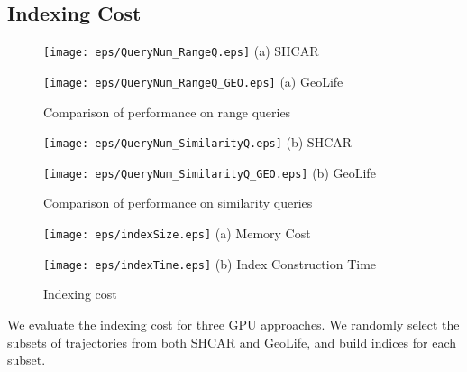 \documentclass[10pt,conference,letterpaper]{IEEEtran}
\begin{document}
\subsection{Indexing Cost}

\begin{figure}[!t]
	\centering
	\scriptsize{
		\begin{minipage}{0.48\linewidth}
			\centering
			\texttt{[image: eps/QueryNum\_RangeQ.eps]}
			(a) SHCAR
		\end{minipage}
		\hfill
		\begin{minipage}{0.48\linewidth}
			\centering
			\texttt{[image: eps/QueryNum\_RangeQ\_GEO.eps]}
			(a) GeoLife
		\end{minipage}	
	}
	\caption{Comparison of performance on range queries \label{fig:QueryNum_range}}
	\vspace{-.1in}
\end{figure}

\begin{figure}[!t]\centering
	\scriptsize{
		\begin{minipage}{0.48\linewidth}
			\centering
			\texttt{[image: eps/QueryNum\_SimilarityQ.eps]}
			(b) SHCAR
		\end{minipage}
		\hfill
		\begin{minipage}{0.48\linewidth}
			\centering
			\texttt{[image: eps/QueryNum\_SimilarityQ\_GEO.eps]}
			(b) GeoLife
		\end{minipage}
	}
	\caption{Comparison of performance on similarity queries \label{fig:QueryNum_sim}}
	\vspace{-.1in}
\end{figure}
\begin{figure}[!t]\centering
	\scriptsize{
		\begin{minipage}{0.48\linewidth}
			\centering
			\texttt{[image: eps/indexSize.eps]}
			(a) Memory Cost
		\end{minipage}
		\hfill
		\begin{minipage}{0.48\linewidth}
			\centering
			\texttt{[image: eps/indexTime.eps]}
			(b) Index Construction Time
		\end{minipage}
	}
	\caption{Indexing cost\label{fig:IndexCost}}
	\vspace{-.1in}
\end{figure}

We evaluate the indexing cost for three GPU approaches. We randomly select the subsets of trajectories from both SHCAR and GeoLife, and build indices for each subset.
\end{document}

